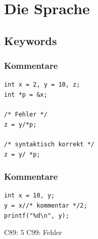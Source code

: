 \documentclass[12pt,compress]{beamer}
\begin{document}
\section{Die Sprache}


\subsection{Keywords}


\begin{frame}[fragile]
\frametitle{Kommentare}

\begin{lstlisting}
int x = 2, y = 10, z;
int *p = &x; 

/* Fehler */
z = y/*p;

/* syntaktisch korrekt */
z = y/ *p;
\end{lstlisting}
\end{frame}

\begin{frame}[fragile]
\frametitle{Kommentare}

\begin{lstlisting}
int x = 10, y;
y = x//* kommentar */2;
printf("%d\n", y);
\end{lstlisting}

\vfill

\begin{center}
C89: 5 \quad\quad C99: Fehler
\end{center}

\end{frame}
\end{document}
